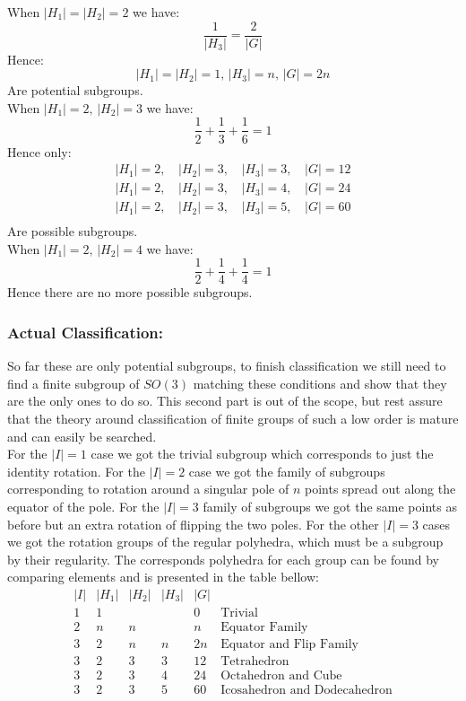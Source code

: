 When $|H_1|=|H_2| = 2$ we have:
\[\frac{1}{|H_3|} = \frac{2}{|G|}\]
Hence:
\[|H_1| = |H_2| = 1,\,|H_3| = n,\, |G|=2n\]
Are potential subgroups.
\\

When $|H_1|=2,\,|H_2|=3$ we have:
\[\frac{1}{2}+\frac{1}{3}+\frac{1}{6} =1\]
Hence only:
\[\begin{matrix}
	|H_1| = 2,\,&|H_2|=3,\,&|H_3|=3,\,&|G|=12\\
	|H_1| = 2,\,&|H_2|=3,\,&|H_3|=4,\,&|G|=24\\
	|H_1| = 2,\,&|H_2|=3,\,&|H_3|=5,\,&|G|=60\\
\end{matrix}\]
Are possible subgroups.
\\

When $|H_1|=2,\,|H_2|=4$ we have:
\[\frac{1}{2}+\frac{1}{4}+\frac{1}{4} =1\]
Hence there are no more possible subgroups.

\subsubsection{Actual Classification:}
So far these are only potential subgroups,
to finish classification we still need to find a finite subgroup of $SO(3)$ matching these conditions and show that they are the only ones to do so.
This second part is out of the scope,
but rest assure that the theory around classification of finite groups of such a low order is mature and can easily be searched.
\\

For the $|I|=1$ case we got the trivial subgroup which corresponds to just the identity rotation.
For the $|I|=2$ case we got the family of subgroups corresponding to rotation around a singular pole of $n$ points spread out along the equator of the pole.
For the $|I|=3$ family of subgroups we got the same points as before but an extra rotation of flipping the two poles.
For the other $|I|=3$ cases we got the rotation groups of the regular polyhedra,
which must be a subgroup by their regularity.
The corresponds polyhedra for each group can be found by comparing elements and is presented in the table bellow:
\[\begin{matrix}
	|I|&|H_1|&|H_2|&|H_3|&|G|\\
	1&1& & &0  &\text{Trivial}\\
	2&n&n& &n  &\text{Equator Family}\\
	3&2&n&n&2n&\text{Equator and Flip Family}\\
	3&2&3&3&12&\text{Tetrahedron}\\
	3&2&3&4&24&\text{Octahedron and Cube}\\
	3&2&3&5&60&\text{Icosahedron and Dodecahedron}\\
\end{matrix}\]
